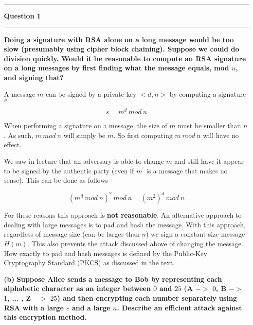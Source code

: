 \documentclass[11pt]{article}
\newcommand\question[2]{\vspace{.25in}\hrule\textbf{#1}\vspace{.5em}\hrule\vspace{.10in}}
\renewcommand\part[1]{\vspace{.10in}\textbf{(#1)}}
\begin{document}
\raggedright
\newcommand\NAME{Jake Pitkin}  %
\newcommand\UID{u0891770}     %
\newcommand\HWNUM{3}              %

\question{Question 1}

\part{a} \textbf{Doing a signature with RSA alone on a long message would be too slow (presumably using cipher block chaining). Suppose we could do division quickly. Would it be reasonable to compute an RSA signature on a long messages by first finding what the message equals, mod $n$, and signing that?}

A message $m$ can be signed by a private key ${<}d,n{>}$ by computing a signature $s$

$$s = m^d \ mod \ n$$

When performing a signature on a message, the size of $m$ must be smaller than $n$. As such, $m \ mod \ n$ will simply be $m$. So first computing $m \ mod \ n$ will have no effect.

We saw in lecture that an adversary is able to change $m$ and still have it appear to be signed by the authentic party (even if $m^\prime$ is a message that makes no sense). This can be done as follows

$$(m^d \ mod \ n)^2 \ mod \ n = (m^2)^d \ mod \ n$$

For these reasons this approach is \textbf{not reasonable}. An alternative approach to dealing with large messages is to pad and hash the message. With this approach, regardless of message size (can be larger than $n$) we sign a constant size message $H(m)$. This also prevents the attack discussed above of changing the message. How exactly to pad and hash messages is defined by the Public-Key Cryptography Standard (PKCS) as discussed in the text.



\part{b} \textbf{Suppose Alice sends a message to Bob by representing each alphabetic character as an integer between $0$ and $25$ (A $->$ $0$, B $->$ $1$, ... , Z $->$ $25$) and then encrypting each number separately using RSA with a large $e$ and a large $n$. Describe an efficient attack against this encryption method.}
\end{document}
